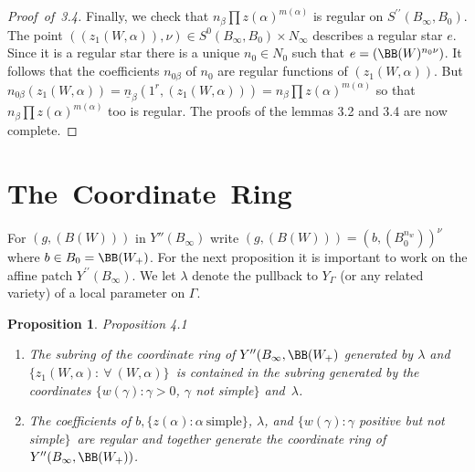 \documentclass{memo-l}
\newtheorem{proposition}[theorem]{Proposition}
\theoremstyle{definition}
\theoremstyle{remark}
\numberwithin{section}{chapter}
\numberwithin{equation}{chapter}
\begin{document}
\begin{proof}[Proof\ of\ 3.4]
Finally, we check that $n_{{\beta}} \prod z({\alpha})^{m({\alpha})}$ 
is regular on $S^{\prime\prime}(B_{{\infty}},B_{0})$. 
The point 
\newline 
$((z_{1}(W,{\alpha})),{\nu}) \in S^{0}(B_{{\infty}},B_{0}) 
\times N_{{\infty}}$ describes a regular star $e$. 
 Since it is a regular star there is a unique $n_0 \in N_{0}$ such that 
$e = ({\BB}(W)^{n_0\nu})$. 
 It follows that the coefficients $n_{0\beta}$ of $n_0$ are regular 
functions of $(z_{1}(W,{\alpha}))$. 
 But $n_{0\beta}(z_{1}(W,{\alpha})) = \underline{n}_{{\beta}}(1^r,
(z_{1}(W,{\alpha}))) = n_{{\beta}} \prod z({\alpha})^{m({\alpha})}$ 
so that $n_{{\beta}} \prod z({\alpha})^{m({\alpha})}$ too is regular. 
 The proofs of the lemmas 3.2 and 3.4 are now complete. 
 \end{proof} 

\section{The\ Coordinate\ Ring}

   For $(g,(B(W)))$ in $Y''(B_{{\infty}})$ write $(g,(B(W))) = 
(b,(B_{0}^{n_w}))^\nu$  where $b \in B_{0}={\BB}(W_{+})$. 
 For the next proposition it is important to work on the affine patch 
$Y^{\prime\prime}(B_{{\infty}})$.  We let $\lambda$ denote the pullback
to $Y_\Gamma$ (or any related variety) of a local parameter on $\Gamma$.

\medpagebreak

\begin{proposition}{Proposition  4.1}   
\begin{enumerate}[label={\alph*)}]
\item The subring of the coordinate ring of $Y^{\prime\prime}(B_\infty,\BB(W_+)$
generated by $\lambda$ and $\{z_{1}(W,{\alpha}): \ \forall\
(W,\alpha)\}$\ is contained in the subring generated by the 
coordinates $\{w({\gamma}) : {\gamma} > 0$, ${\gamma}$ not simple$\}$
and\ ${\lambda}$.
\item The coefficients of $b, \{z({\alpha}):{\alpha}\ {\text{simple}}\}$, 
${\lambda}$, 
and $\{w({\gamma}):{\gamma}$ positive but not simple$\}$\ are regular and together generate 
the coordinate ring of \hfil\break $Y''(B_{{\infty}},{\BB}(W_{+}))$.
\end{enumerate}
\end{proposition}
\end{document}
